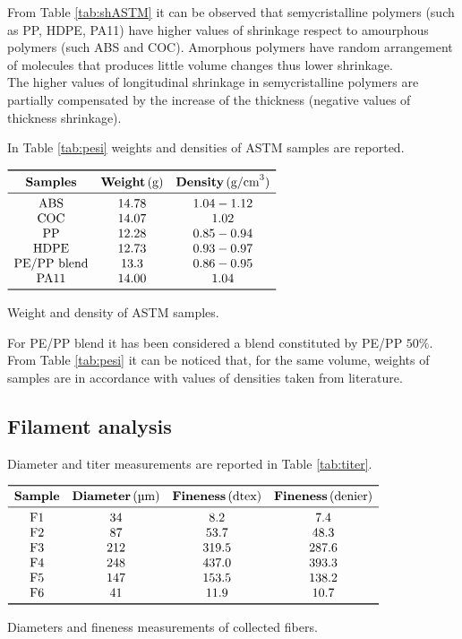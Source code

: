 \documentclass[a4paper, 11pt]{article}
\begin{document}
From Table \ref{tab:shASTM} it can be observed that semycristalline polymers (such as PP, HDPE, PA11) have higher values of shrinkage respect to amourphous polymers (such ABS and COC). Amorphous polymers have random arrangement of molecules that produces little volume changes thus lower shrinkage. \\
The higher values of longitudinal shrinkage in semycristalline polymers are partially compensated by the increase of the thickness (negative values of thickness shrinkage).

In Table \ref{tab:pesi} weights and densities of ASTM samples are reported.

\begin{table}[htp]
\centering
$
\begin{array}{ccc}
\toprule
\textbf{Samples} & \textbf{Weight}\,(\text{g}) & \textbf{Density}\,(\text{g/cm}^3) \\
\midrule
\text{ABS} & 14.78 & 1.04-1.12  \\
\text{COC} & 14.07 & 1.02 \\
\text{PP} & 12.28 & 0.85-0.94 \\
\text{HDPE} & 12.73 & 0.93-0.97 \\
\text{PE/PP blend} & 13.3 & 0.86-0.95 \\
\text{PA11} & 14.00 & 1.04 \\
\bottomrule
\end{array}
$
\caption{Weight and density of ASTM samples.}
\label{tab:pesi}
\end{table}

For PE/PP blend it has been considered a blend constituted by PE/PP $50\%$. From Table \ref{tab:pesi} it can be noticed that, for the same volume, weights of samples are in accordance with values of densities taken from literature. 

\subsection{Filament analysis}

Diameter and titer measurements are reported in Table \ref{tab:titer}.
\begin{table}[htp]
\centering
$
\begin{array}{cccc}
\toprule
\textbf{Sample} & \textbf{Diameter} \, (\text{µm}) & \textbf{Fineness}\, (\text{dtex}) & \textbf{Fineness} \, (\text{denier}) \\
\midrule
\text{F1} & 34 & 8.2 & 7.4 \\
\text{F2} & 87 & 53.7 & 48.3 \\ 
\text{F3} & 212 & 319.5 & 287.6 \\
\text{F4} & 248 & 437.0 & 393.3 \\
\text{F5} & 147 & 153.5 & 138.2 \\
\text{F6} & 41 & 11.9 & 10.7 \\
\bottomrule
\end{array}
$
\caption{Diameters and fineness measurements of collected fibers.}
\label{tab:titer}
\end{table}
\end{document}
